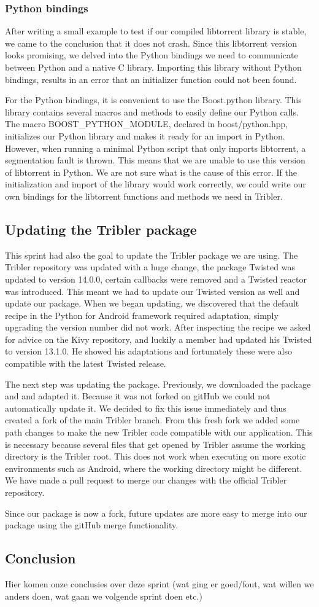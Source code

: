 		\subsubsection{Python bindings}
			After writing a small example to test if our compiled libtorrent library is stable, we came to the conclusion that it does not crash. Since this libtorrent version looks promising, we delved into the Python bindings we need to communicate between Python and a native C library. Importing this library without Python bindings, results in an error that an initializer function could not been found.
		
			For the Python bindings, it is convenient to use the Boost.python library. This library contains several macros and methods to easily define our Python calls. The macro BOOST\_PYTHON\_MODULE, declared in boost/python.hpp, initializes our Python library and makes it ready for an import in Python. However, when running a minimal Python script that only imports libtorrent, a segmentation fault is thrown. This means that we are unable to use this version of libtorrent in Python. We are not sure what is the cause of this error. If the initialization and import of the library would work correctly, we could write our own bindings for the libtorrent functions and methods we need in Tribler.
				
	\subsection{Updating the Tribler package}
		This sprint had also the goal to update the Tribler package we are using. The Tribler repository was updated with a huge change, the package Twisted was updated to version 14.0.0, certain callbacks were removed and a Twisted reactor was introduced. This meant we had to update our Twisted version as well and update our package.
		When we began updating, we discovered that the default recipe in the Python for Android framework required adaptation, simply upgrading the version number did not work. After inspecting the recipe we asked for advice on the Kivy repository, and luckily a member had updated his Twisted to version 13.1.0. He showed his adaptations and fortunately these were also compatible with the latest Twisted release.
		
		The next step was updating the package. Previously, we downloaded the package and and adapted it. Because it was not forked on gitHub we could not automatically update it. We decided to fix this issue immediately and thus created a fork of the main Tribler branch. From this fresh fork we added some path changes to make the new Tribler code compatible with our application. This is necessary because several files that get opened by Tribler assume the working directory is the Tribler root. This does not work when executing on more exotic environments such as Android, where the working directory might be different. We have made a pull request to merge our changes with the official Tribler repository.
		
		Since our package is now a fork, future updates are more easy to merge into our package using the gitHub merge functionality.
			
	\subsection{Conclusion}
		Hier komen onze conclusies over deze sprint (wat ging er goed/fout, wat willen we anders doen, wat gaan we volgende sprint doen etc.)
